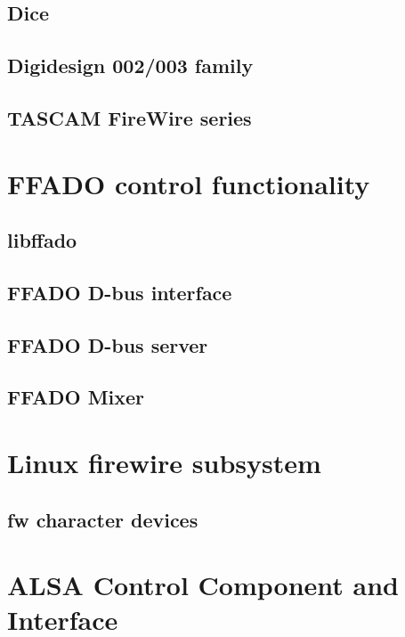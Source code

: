 \documentclass[onecolumn]{article}
\begin{document}
\subsection{Dice}

\subsection{Digidesign 002/003 family}

\subsection{TASCAM FireWire series}

\section{FFADO control functionality}

\subsection{libffado}

\subsection{FFADO D-bus interface}

\subsection{FFADO D-bus server}

\subsection{FFADO Mixer}

\section{}

\section{Linux firewire subsystem}

\subsection{fw character devices}


\section{ALSA Control Component and Interface}
\end{document}
